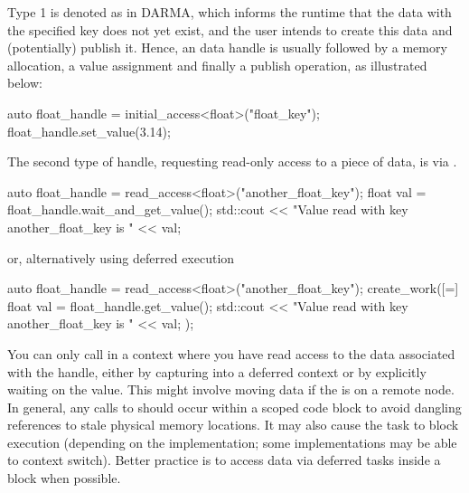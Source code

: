 Type 1 is denoted as  in DARMA, which informs the runtime that the data with the 
specified key does not yet exist, and the user intends to create this data and
(potentially) publish it.
Hence, an 
data handle is usually followed by a memory allocation, a value assignment and finally a publish operation, as illustrated below: 

\begin{CppCode}
auto float_handle = initial_access<float>("float_key");
float_handle.set_value(3.14);
\end{CppCode}
The second type of handle, requesting read-only access to a piece of data, is via . 

\begin{CppCode}
auto float_handle = read_access<float>("another_float_key");
{
  float val = float_handle.wait_and_get_value();
  std::cout << "Value read with key another_float_key is " << val;
}
\end{CppCode}
or, alternatively using deferred execution
\begin{CppCode}
auto float_handle = read_access<float>("another_float_key");
create_work([=]{
  float val = float_handle.get_value();
  std::cout << "Value read with key another_float_key is " << val;  
});
\end{CppCode}
You can only call  in a context where you have read access
to the data associated with the handle, either by capturing into a deferred
context or by explicitly waiting on the value.  This might involve moving data
if the  is on a remote node.
In general, any calls to  should occur within a scoped code block to avoid dangling references to stale physical memory locations.
It may also cause the task to block execution (depending on the implementation; some implementations may be able to context switch).
Better practice is to access data via deferred tasks inside a
 block when possible.

